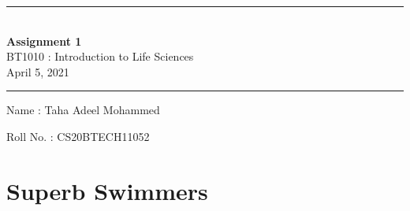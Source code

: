 \documentclass[12pt]{article}
\begin{document}
\begin{center}
\par\noindent\rule{\textwidth}{0.6pt}\\[0.3cm]
\textbf{\LARGE{Assignment 1}}\\[0.3cm]
\Large{BT1010 : Introduction to Life Sciences}\\[0.1cm]
\large{April 5, 2021}\\[0cm]
\par\noindent\rule{\textwidth}{0.6pt}
\end{center}
\noindent
\hspace{0.4cm}Name : Taha Adeel Mohammed
\par \noindent
\hspace{0.4cm}Roll No. : CS20BTECH11052
\section*{Superb Swimmers}
\noindent{}
\par \vspace{4mm}
\end{document}
